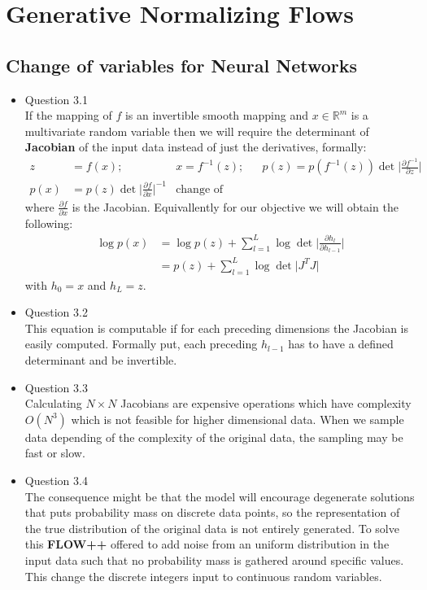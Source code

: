 \documentclass{article}
\begin{document}
  \section{Generative Normalizing Flows}
      \subsection{Change of variables for Neural Networks}
        \begin{itemize} 
          \item Question 3.1 \\
          If the mapping of $f$ is an invertible smooth mapping and $x \in \mathbb{R}^m$ is a multivariate random variable then we will require the determinant of \textbf{Jacobian} of the input data instead of just the derivatives, formally:
          \begin{align*}
            z &= f(x); & x = f^{-1}(z); && p(z) = p( f^{-1}(z)) \det \Big| \frac{\partial f^{-1}}{\partial z} \Big| \\
            p(x) &= p(z) \det \Big| \frac{ \partial f}{\partial x} \Big|^{-1} & \text{change of variables}
          \end{align*} where $ \frac{ \partial f}{\partial x}$ is the Jacobian. Equivallently for our objective we will obtain the following:
          \begin{align*}
            \log p(x) &= \log p(z) + \sum_{l = 1}^{L} \log \det \Big| \frac{\partial h_l}{\partial h_{l -1}}\Big| \\
            &= p(z) +  \sum_{l = 1}^{L} \log \det \Big|J^TJ \Big|
          \end{align*} with $h_0 = x$ and $h_L = z$. 
          \item Question 3.2 \\
          This equation is computable if for each preceding dimensions the Jacobian is easily computed. Formally put, each preceding $h_{l-1}$ has to have a defined determinant and be invertible. 
          \item Question 3.3 \\
          Calculating $N \times N$ Jacobians are expensive operations which have complexity $O(N^3)$ which is not feasible for higher dimensional data. When we sample data depending of the complexity of the original data, the sampling may be fast or slow.
          \item Question 3.4 \\
          The consequence might be that the model will encourage degenerate solutions  that puts probability mass on discrete data points, so the representation of the true distribution of the original data is not entirely generated. To solve this \textbf{FLOW++} offered to add noise from an uniform distribution in the input data such that no probability mass is gathered around specific values. This change the discrete integers input to continuous random variables. 
        \end{itemize}
\end{document}
